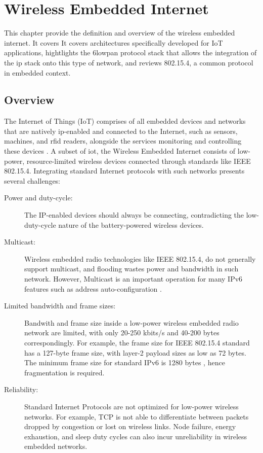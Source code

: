 \chapter{Wireless Embedded Internet} \label{chap:wei}

This chapter provide the definition and overview of the wireless embedded internet. It covers
It covers architectures specifically developed for IoT applications, hightlights the \gls{6lowpan}
protocol stack that allows the integration of the \gls{ip} stack onto this type
of network, and reviews 802.15.4, a common protocol in embedded context.

\section{Overview}
The Internet of Things (IoT) comprises of all embedded devices and networks that are natively 
\gls{ip}-enabled and connected to the Internet, such as sensors, machines, and \gls{rfid} readers, 
alongside the services monitoring and controlling these devices \cite{wie}. A subset of \gls{iot}, 
the Wireless Embedded Internet consists of low-power, resource-limited wireless devices 
connected through standards like IEEE 802.15.4. Integrating standard Internet protocols with such networks 
presents several challenges:

\begin{description}
  \item[Power and duty-cycle:] The IP-enabled devices should always be connecting, contradicting the low-duty-cycle
 nature of the battery-powered wireless devices.
  \item[Multicast:] Wireless embedded radio technologies like IEEE 802.15.4, do not generally support multicast, and
 flooding wastes power and bandwidth in such network. However, Multicast is an important operation
 for many IPv6 features such as address auto-configuration \cite{rfc4862}. 
  \item[Limited bandwidth and frame sizes:] Bandwith and frame size inside a low-power wireless embedded radio network
 are limited, with only 20-250 kbits/s and 40-200 bytes correspondingly. For example, the frame size 
 for IEEE 802.15.4 standard has a 127-byte frame size, with layer-2 payload sizes as low as 72 bytes. The minimum
 frame size for standard IPv6 is 1280 bytes \cite{rfc8200}, hence fragmentation is required.
  \item[Reliability:] Standard Internet Protocols are not optimized for low-power wireless networks. For
 example, TCP is not able to differentiate between packets dropped by congestion or lost on wireless links.
 Node failure, energy exhaustion, and sleep duty cycles can also incur unreliability in wireless embedded networks.
\end{description}


